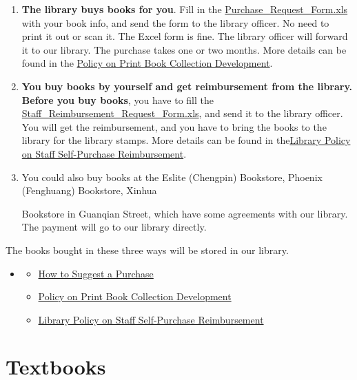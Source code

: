 \documentclass[
]{book}
\providecommand{\tightlist}{%
  \setlength{\itemsep}{0pt}\setlength{\parskip}{0pt}}
\newenvironment{rmdblock}[1]
  {\begin{shaded*}
  \begin{itemize}
  \renewcommand{\labelitemi}{
    \raisebox{-.7\height}[0pt][0pt]{
      {\setkeys{Gin}{width=2em,keepaspectratio}\texttt{[image: image/\#1]}}
    }
  }
  \item
  }
  {
  \end{itemize}
  \end{shaded*}
  }
\newenvironment{rmdrd}
  {\begin{rmdblock}{rd}}
  {\end{rmdblock}}
\begin{document}
\begin{enumerate}
\def\labelenumi{\arabic{enumi}.}
\item
  \textbf{The library buys books for you}. Fill in the \href{http://libguides.lib.xjtlu.edu.cn/ld.php?content_id=15552390}{Purchase\_Request\_Form.xls} with your book info, and send the form to the library officer. No need to print it out or scan it. The Excel form is fine. The library officer will forward it to our library. The purchase takes one or two months. More details can be found in the \href{http://libguides.lib.xjtlu.edu.cn/ld.php?content_id=15552051}{Policy on Print Book Collection Development}.
\item
  \textbf{You buy books by yourself and get reimbursement from the library.} \textbf{Before you buy books}, you have to fill the \href{https://libguides.lib.xjtlu.edu.cn/ld.php?content_id=47964273}{Staff\_Reimbursement\_Request\_Form.xls}, and send it to the library officer. You will get the reimbursement, and you have to bring the books to the library for the library stamps. More details can be found in the\href{http://libguides.lib.xjtlu.edu.cn/ld.php?content_id=15552277}{Library Policy on Staff Self-Purchase Reimbursement}.
\item
  You could also buy books at the Eslite (Chengpin) Bookstore, Phoenix (Fenghuang) Bookstore, Xinhua

  Bookstore in Guanqian Street, which have some agreements with our library. The payment will go to our library directly.
\end{enumerate}

The books bought in these three ways will be stored in our library.

\begin{rmdrd}
\begin{itemize}
\tightlist
\item
  \href{https://libguides.lib.xjtlu.edu.cn/c.php?g=376964\&p=6685926}{How to Suggest a Purchase}
\item
  \href{http://libguides.lib.xjtlu.edu.cn/ld.php?content_id=15552051}{Policy on Print Book Collection Development}
\item
  \href{http://libguides.lib.xjtlu.edu.cn/ld.php?content_id=15552277}{Library Policy on Staff Self-Purchase Reimbursement}
\end{itemize}
\end{rmdrd}

\hypertarget{textbooks}{%
\section{Textbooks}\label{textbooks}}
\end{document}
